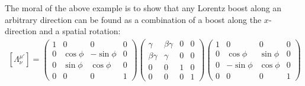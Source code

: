 \documentclass{book}
\theoremstyle{definition}
\begin{document}
The moral of the above example is to show that any Lorentz boost along an arbitrary direction can be found as a combination of a boost along the $x$-direction and a spatial rotation:
\begin{align*}
\boxed{
[\Lambda^{\mu'}_\nu] = 
\begin{pmatrix}
1 & 0 & 0 & 0 \\
0 & \cos\phi & -\sin\phi & 0\\
0 & \sin\phi & \cos\phi & 0\\
0 & 0 & 0 & 1
\end{pmatrix}
\begin{pmatrix}
\gamma & \beta\gamma & 0 & 0\\
\beta\gamma & \gamma & 0 & 0\\
0 & 0 & 1 & 0\\
0 & 0 & 0 & 1
\end{pmatrix}
\begin{pmatrix}
1 & 0 & 0 & 0 \\
0 & \cos\phi & \sin\phi & 0\\
0 & -\sin\phi & \cos\phi & 0\\
0 & 0 & 0 & 1
\end{pmatrix}}
\end{align*}
\end{document}

